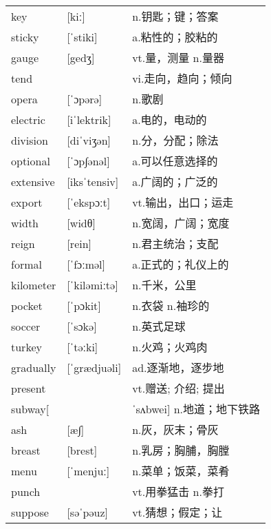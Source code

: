 \documentclass[a4paper]{article}
\begin{document}
\section{}
\begin{tabular}{l l l}

key & [kiː] & n.钥匙；键；答案 \\
sticky & [ˈstiki] & a.粘性的；胶粘的 \\
gauge & [gedʒ] & vt.量，测量 n.量器 \\
tend &  & vi.走向，趋向；倾向 \\
opera & [ˈɔpərə] & n.歌剧 \\
electric & [iˈlektrik] & a.电的，电动的 \\
division & [diˈviʒən] & n.分，分配；除法 \\
optional & [ˈɔp∫ənəl] & a.可以任意选择的 \\
extensive & [iksˈtensiv] & a.广阔的；广泛的 \\
export & [ˈekspɔːt] & vt.输出，出口；运走 \\
width & [widθ] & n.宽阔，广阔；宽度 \\
reign & [rein] & n.君主统治；支配 \\
formal & [ˈfɔːməl] & a.正式的；礼仪上的 \\
kilometer & [ˈkiləmiːtə] & n.千米，公里 \\
pocket & [ˈpɔkit] & n.衣袋 n.袖珍的 \\
soccer & [ˈsɔkə] & n.英式足球 \\
turkey & [ˈtəːki] & n.火鸡；火鸡肉 \\
gradually & [ˈgrædjuəli] & ad.逐渐地，逐步地 \\
present &  & vt.赠送; 介绍; 提出 \\
subway[ &  & ˈsʌbwei] n.地道；地下铁路 \\
ash & [æ∫] & n.灰，灰末；骨灰 \\
breast & [brest] & n.乳房；胸脯，胸膛 \\
menu & [ˈmenjuː] & n.菜单；饭菜，菜肴 \\
punch &  & vt.用拳猛击 n.拳打 \\
suppose & [səˈpəuz] & vt.猜想；假定；让 \\

\end{tabular}
\end{document}
